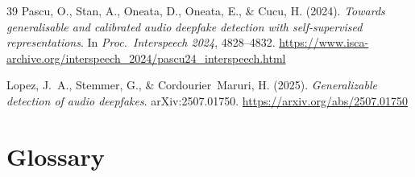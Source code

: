 \documentclass[11pt,a4paper]{article}
\begin{document}
\begin{thebibliography}{39}
Pascu, O., Stan, A., Oneata, D., Oneata, E., \& Cucu, H. (2024).
\textit{Towards generalisable and calibrated audio deepfake detection with
self-supervised representations}.
In \textit{Proc.\ Interspeech 2024}, 4828--4832.
\url{https://www.isca-archive.org/interspeech_2024/pascu24_interspeech.html}

Lopez, J.~A., Stemmer, G., \& Cordourier~Maruri, H. (2025).
\textit{Generalizable detection of audio deepfakes}. arXiv:2507.01750.
\url{https://arxiv.org/abs/2507.01750}

\end{thebibliography}

\appendix
\section{Glossary}
\end{document}
